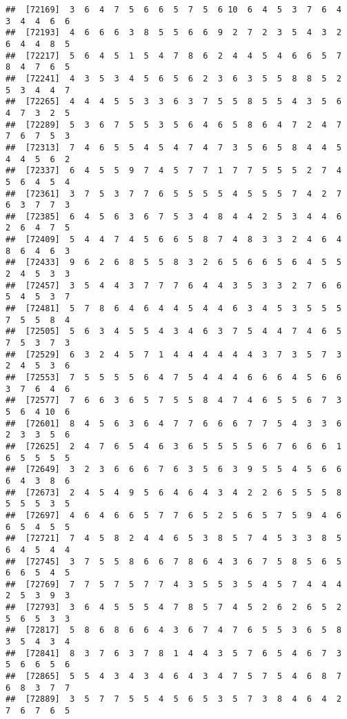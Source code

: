 \documentclass[
]{book}
\begin{document}
\begin{verbatim}
##  [72169]  3  6  4  7  5  6  6  5  7  5  6 10  6  4  5  3  7  6  4  3  4  4  6  6
##  [72193]  4  6  6  6  3  8  5  5  6  6  9  2  7  2  3  5  4  3  2  6  4  4  8  5
##  [72217]  5  6  4  5  1  5  4  7  8  6  2  4  4  5  4  6  6  5  7  8  4  7  6  5
##  [72241]  4  3  5  3  4  5  6  5  6  2  3  6  3  5  5  8  8  5  2  5  3  4  4  7
##  [72265]  4  4  4  5  5  3  3  6  3  7  5  5  8  5  5  4  3  5  6  4  7  3  2  5
##  [72289]  5  3  6  7  5  5  3  5  6  4  6  5  8  6  4  7  2  4  7  7  6  7  5  3
##  [72313]  7  4  6  5  5  4  5  4  7  4  7  3  5  6  5  8  4  4  5  4  4  5  6  2
##  [72337]  6  4  5  5  9  7  4  5  7  7  1  7  7  5  5  5  2  7  4  5  6  4  5  4
##  [72361]  3  7  5  3  7  7  6  5  5  5  5  4  5  5  5  7  4  2  7  6  3  7  7  3
##  [72385]  6  4  5  6  3  6  7  5  3  4  8  4  4  2  5  3  4  4  6  2  6  4  7  5
##  [72409]  5  4  4  7  4  5  6  6  5  8  7  4  8  3  3  2  4  6  4  8  6  4  6  3
##  [72433]  9  6  2  6  8  5  5  8  3  2  6  5  6  6  5  6  4  5  5  2  4  5  3  3
##  [72457]  3  5  4  4  3  7  7  7  6  4  4  3  5  3  3  2  7  6  6  5  4  5  3  7
##  [72481]  5  7  8  6  4  6  4  4  5  4  4  6  3  4  5  3  5  5  5  7  5  5  8  4
##  [72505]  5  6  3  4  5  5  4  3  4  6  3  7  5  4  4  7  4  6  5  7  5  3  7  3
##  [72529]  6  3  2  4  5  7  1  4  4  4  4  4  4  3  7  3  5  7  3  2  4  5  3  6
##  [72553]  7  5  5  5  5  6  4  7  5  4  4  4  6  6  6  4  5  6  6  3  7  6  4  6
##  [72577]  7  6  6  3  6  5  7  5  5  8  4  7  4  6  5  5  6  7  3  5  6  4 10  6
##  [72601]  8  4  5  6  3  6  4  7  7  6  6  6  7  7  5  4  3  3  6  2  3  3  5  6
##  [72625]  2  4  7  6  5  4  6  3  6  5  5  5  5  6  7  6  6  6  1  6  5  5  5  5
##  [72649]  3  2  3  6  6  6  7  6  3  5  6  3  9  5  5  4  5  6  6  6  4  3  8  6
##  [72673]  2  4  5  4  9  5  6  4  6  4  3  4  2  2  6  5  5  5  8  5  5  5  3  5
##  [72697]  4  6  4  6  6  5  7  7  6  5  2  5  6  5  7  5  9  4  6  6  5  4  5  5
##  [72721]  7  4  5  8  2  4  4  6  5  3  8  5  7  4  5  3  3  8  5  6  4  5  4  4
##  [72745]  3  7  5  5  8  6  6  7  8  6  4  3  6  7  5  8  5  6  5  6  6  5  4  5
##  [72769]  7  7  5  7  5  7  7  4  3  5  5  3  5  4  5  7  4  4  4  2  5  3  9  3
##  [72793]  3  6  4  5  5  5  4  7  8  5  7  4  5  2  6  2  6  5  2  5  6  5  3  3
##  [72817]  5  8  6  8  6  6  4  3  6  7  4  7  6  5  5  3  6  5  8  3  5  4  3  4
##  [72841]  8  3  7  6  3  7  8  1  4  4  3  5  7  6  5  4  6  7  3  5  6  6  5  6
##  [72865]  5  5  4  3  4  3  4  6  4  3  4  7  5  7  5  4  6  8  7  6  8  3  7  7
##  [72889]  3  5  7  7  5  5  4  5  6  5  3  5  7  3  8  4  6  4  2  7  6  7  6  5

\end{verbatim}
\end{document}
